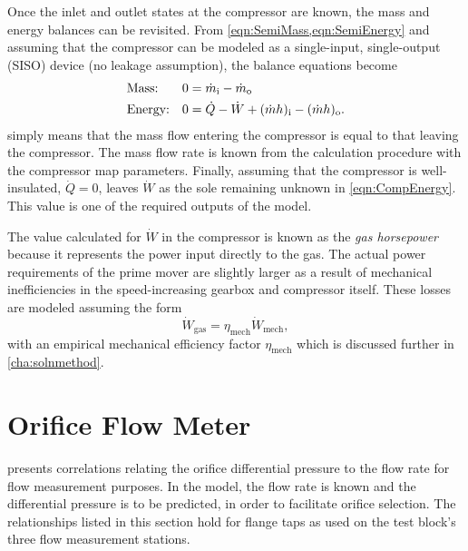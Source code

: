 Once the inlet and outlet states at the compressor are known, 
the mass and energy balances can be revisited. 
From \cref{eqn:SemiMass,eqn:SemiEnergy} and
assuming that the compressor can be modeled as a 
single-input, single-output (SISO) device (no leakage assumption), 
the balance equations become
\begin{align}
  &\text{Mass:}   & 0 &= {\dot{m}_{\text{i}}} - {\dot{m}_{\text{o}}} \label{eqn:CompMass}\\
  &\text{Energy:} & 0 &= \dot{Q} - \dot{W} + {(\dot{m}h)_{\text{i}}} - 
		{(\dot{m}h)_{\text{o}}} \label{eqn:CompEnergy}.
\end{align}
 simply means that the mass flow 
entering the compressor is equal to that leaving the compressor. 
The mass flow rate is known from the 
calculation procedure with the compressor map parameters. 
Finally, assuming that the compressor is well-insulated, 
$\dot{Q}=0$, leaves $\dot{W}$ 
as the sole remaining unknown in \cref{eqn:CompEnergy}. 
This value is one of the required outputs of the model. 

The value calculated for $\dot{W}$ in the compressor is known
as the \emph{gas horsepower} because it represents the power input
directly to the gas. The actual power requirements of the
prime mover are slightly larger as a result of mechanical inefficiencies
in the speed-increasing gearbox and compressor itself.
These losses are modeled assuming the form
\begin{equation}
  \dot{W}_{\text{gas}} = \eta_{\text{mech}}\dot{W}_{\text{mech}},
\end{equation}
with an empirical mechanical efficiency factor $\eta_{\text{mech}}$
which is discussed further in \cref{cha:solnmethod}.

\section{Orifice Flow Meter} \label{sec:Orifice}
\textcite{ptc19} presents correlations relating the orifice differential pressure to the
flow rate for flow measurement purposes.
In the model, the flow rate is known and the differential pressure is to be predicted,
in order to facilitate orifice selection.
The relationships listed in this section hold for flange taps as used
on the  test block's three flow measurement stations.

